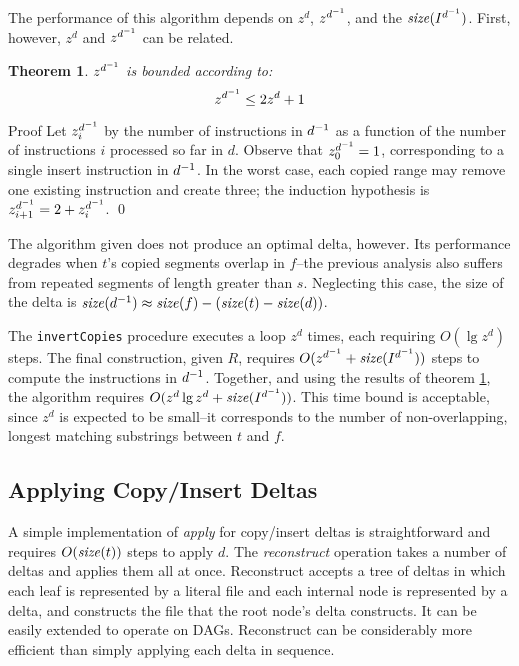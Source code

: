 \documentclass{llncs}
\newtheorem{thrm}{{\sc Theorem}}
\begin{document}
The performance of this algorithm depends on $z^d$, $z^{d^{-1}}$, and
the $\textrm{\emph{size}}(I^{d^{-1}})$.  First, however, $z^d$ and $z^{d^{-1}}$ can
be related.

\begin{thrm} \label{thrm:zrel}
$z^{d^{-1}}$ is bounded according to:
\begin{equation}
z^{d^{-1}} \le 2 z^d + 1
\end{equation}
\end{thrm}

{\sc Proof} Let $z^{d^{-1}}_i$ by the number of instructions in
$d^{-1}$ as a function of the number of instructions $i$ processed so
far in $d$.  Observe that $z^{d^{-1}}_0 = 1$, corresponding to a
single insert instruction in $d^{-1}$.  In the worst case, each
copied range may remove one existing instruction and create three; the
induction hypothesis is $z^{d^{-1}}_{i+1} = 2 + z^{d^{-1}}_{i}$. \qed

The algorithm given does not produce an optimal delta, however.  Its
performance degrades when $t$'s copied segments overlap in $f$--the
previous analysis also suffers from repeated segments of length
greater than $s$.  Neglecting this case, the size of the delta is
$\textrm{\emph{size}}(d^{-1}) \approx \textrm{\emph{size}}(f) - (\textrm{\emph{size}}(t) - \textrm{\emph{size}}(d))$.

The \texttt{invertCopies} procedure executes a loop $z^d$ times, each
requiring $O(\lg z^d)$ steps.  The final construction, given $R$,
requires $O(z^{d^{-1}} + \textrm{\emph{size}}(I^{d^{-1}}))$ steps to compute the
instructions in $d^{-1}$.  Together, and using the results of theorem
\ref{thrm:zrel}, the algorithm requires $O(z^d \lg z^d +
\textrm{\emph{size}}(I^{d^{-1}}))$.  This time bound is acceptable, since $z^d$ is
expected to be small--it corresponds to the number of non-overlapping,
longest matching substrings between $t$ and $f$.

\subsection{Applying Copy/Insert Deltas}

A simple implementation of \emph{apply} for copy/insert deltas is
straightforward and requires $O(\textrm{\emph{size}}(t))$ steps to apply $d$.  The
\emph{reconstruct} operation takes a number of deltas and applies them
all at once.  Reconstruct accepts a tree of deltas in which each leaf
is represented by a literal file and each internal node is represented
by a delta, and constructs the file that the root node's delta
constructs.  It can be easily extended to operate on DAGs.
Reconstruct can be considerably more efficient than simply applying
each delta in sequence.
\end{document}
